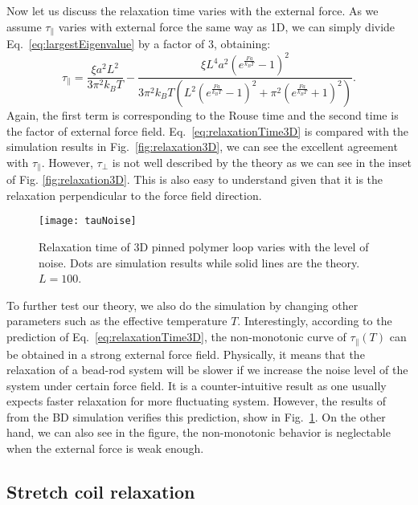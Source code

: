Now let us discuss the relaxation time varies with the external force. As we assume $\tau_{\parallel}$ varies with external force the same way as 1D, we can simply divide Eq.~\eqref{eq:largestEigenvalue} by a factor of $3$, obtaining:
\begin{equation}
    \label{eq:relaxationTime3D}
    \tau_{\parallel} = \frac{\xi a^2 L^2}{3 \pi^2 k_{B} T} - \frac{\xi L^4 a^2 \left(e^{\frac{F a}{k_{B} T}} - 1\right)^2} {3 \pi^2 k_{B} T \left(L^2 \left(e^{\frac{F a}{k_{B}T}} - 1\right)^2 + \pi^2 \left(e^{\frac{F a}{k_{B}T}} + 1\right)^2\right)}.
\end{equation}
Again, the first term is corresponding to the Rouse time and the second time is the factor of external force field. Eq.~\eqref{eq:relaxationTime3D} is compared with the simulation results in Fig.~\ref{fig:relaxation3D}, we can see the excellent agreement with $\tau_{\parallel}$. However, $\tau_{\perp}$ is not well described by the theory as we can see in the inset of Fig. \ref{fig:relaxation3D}. This is also easy to understand given that it is the relaxation perpendicular to the force field direction. 

\begin{figure}[htpb]
    \centering
    \texttt{[image: tauNoise]}
    \caption{Relaxation time of 3D pinned polymer loop varies with the level of noise. Dots are simulation results while solid lines are the theory. $L=100$.}
    \label{fig:tauNoise}
\end{figure}
To further test our theory, we also do the simulation by changing other parameters such as the effective temperature $T$. Interestingly, according to the prediction of Eq.~\eqref{eq:relaxationTime3D}, the non-monotonic curve of $\tau_{\parallel}(T)$ can be obtained in a strong external force field. Physically, it means that the relaxation of a bead-rod system will be slower if we increase the noise level of the system under certain force field.  It is a counter-intuitive result as one usually expects faster relaxation for more fluctuating system. However, the results of from the BD simulation verifies this prediction, show in Fig.~\ref{fig:tauNoise}. On the other hand, we can also see in the figure, the non-monotonic behavior is neglectable when the external force is weak enough.

\subsection{Stretch coil relaxation}
\label{sub:stretch_coil_relaxation}

